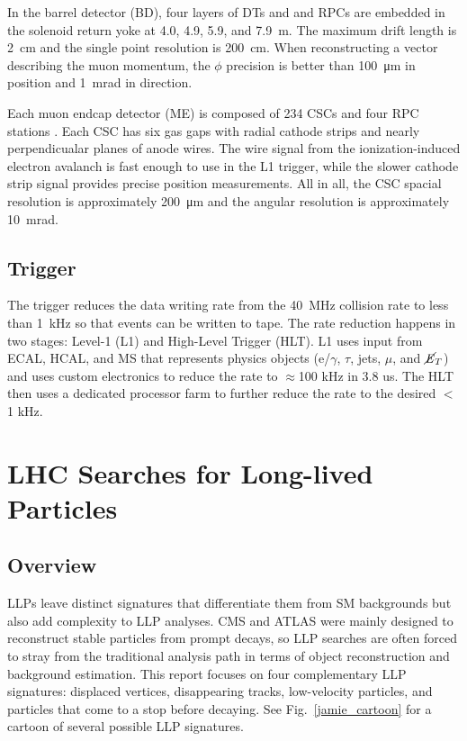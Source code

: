 \documentclass[12pt]{article}
\begin{document}
        In the barrel detector (BD), four layers of DTs and and RPCs are embedded in the solenoid return yoke at \num{4.0}, \num{4.9}, \num{5.9}, and \SI{7.9}{m}. The maximum drift length is \SI{2}{\cm} and the single point resolution is \SI{200}{\cm}. When reconstructing a vector describing the muon momentum, the $\phi$ precision is better than \SI{100}{\micro\m} in position and \SI{1}{\milli\radian} in direction. 

        Each muon endcap detector (ME) is composed of \num{234} CSCs and four RPC stations . Each CSC has six gas gaps with radial cathode strips and nearly perpendicualar planes of anode wires. The wire signal from the ionization-induced electron avalanch is fast enough to use in the L1 trigger, while the slower  cathode strip signal provides precise  position measurements. All in all, the CSC spacial resolution is approximately \SI{200}{\micro\m} and the angular resolution is approximately \SI{10}{\milli\radian}.

    \subsection{Trigger}
        The trigger reduces the data writing rate from the \SI{40}{\mega\hertz} collision rate to less than \SI{1}{\kilo\hertz} so that events can be written to tape. The rate reduction happens in two stages: Level-1 (L1) and High-Level Trigger (HLT). L1 uses input from ECAL, HCAL, and MS that represents physics objects ($\mathrm{e}$/$\gamma$, $\tau$, jets, $\mu$, and $\cancel{\it{E}}_{T}$) and uses custom electronics to reduce the rate to $\approx$100 kHz in 3.8 us. The HLT then uses a dedicated processor farm to further reduce the rate to the desired $<$ 1 kHz\cite{cms_experiment, cms_trigger_upgrade}.

\section{LHC Searches for Long-lived Particles} \label {analyses}
    \subsection{Overview}
        LLPs leave distinct signatures that differentiate them from SM backgrounds but also add complexity to LLP analyses. CMS and ATLAS were mainly designed to reconstruct stable particles from prompt decays, so LLP searches are often forced to stray from the traditional analysis path in terms of object reconstruction and background estimation. This report focuses on four complementary LLP signatures: displaced vertices, disappearing tracks, low-velocity particles, and particles that come to a stop before decaying. See Fig.~\ref{jamie_cartoon} for a cartoon of several possible LLP signatures.
\end{document}
